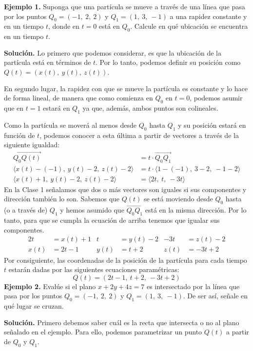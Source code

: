 \documentclass[12pt]{article}
\begin{document}
\textbf{Ejemplo 1.} Suponga que una partícula se mueve a través de una línea que pasa por los puntos $Q_{0} = (-1, \ 2, \ 2)$ y $Q_{1} = (1, \ 3, \ -1)$ a una rapidez constante y en un tiempo $t$, donde en $t = 0$ está en $Q_{0}$. Calcule en qué ubicación se encuentra en un tiempo $t$.

\textbf{Solución.} Lo primero que podemos considerar, es que la ubicación de la partícula está en términos de $t$. Por lo tanto, podemos definir su posición como $Q(t) = (x(t), \ y(t), \ z(t))$.

En segundo lugar, la rapidez con que se mueve la partícula es constante y lo hace de forma lineal, de manera que como comienza en $Q_{0}$ en $t = 0$, podemos asumir que en $t = 1$ estará en $Q_{1}$ ya que, además, ambos puntos son colineales.

Como la partícula se moverá al menos desde $Q_{0}$ hasta $Q_{1}$ y su posición estará en función de $t$, podemos conocer a esta última a partir de vectores a través de la siguiente igualdad:
\begin{align*}
  \overrightarrow{Q_{0}Q(t)} &= t \cdot \overrightarrow{Q_{0}Q_{1}} \\
  \langle x(t) - (-1), \ y(t) - 2, \ z(t) - 2 \rangle &= t \cdot \langle 1 - (-1), \ 3 - 2, \ - 1 - 2 \rangle \\
  \langle x(t) + 1, \ y(t) - 2, \ z(t) - 2 \rangle &= \langle 2t, \ t, \ -3t \rangle
\end{align*}
En la Clase 1 señalamos que dos o más vectores son iguales si sus componentes y dirección también lo son. Sabemos que $Q(t)$ se está moviendo desde $Q_{0}$ hasta (o a través de) $Q_{1}$ y hemos asumido que $\overrightarrow{Q_{0}Q_{1}}$ está en la misma dirección. Por lo tanto, para que se cumpla la ecuación de arriba tenemos que igualar sus componentes.
\begin{align*}
2t &= x(t) + 1 & t &= y(t) - 2 & -3t &= z(t) - 2 \\
x(t) &= 2t - 1 & y(t) &= t + 2 & z(t) &= -3t + 2
\end{align*}
Por consiguiente, las coordenadas de la posición de la partícula para cada tiempo $t$ estarán dadas por las siguientes ecuaciones paramétricas:
\[
  Q(t) = (2t - 1, \ t + 2, \ -3t + 2)
\]
\textbf{Ejemplo 2.} Evalúe si el plano $x + 2y + 4z = 7$ es intersectado por la línea que pasa por los puntos $Q_{0} = (-1, \ 2, \ 2)$ y $Q_{1} = (1, \ 3, \ -1)$. De ser así, señale en qué lugar se cruzan.

\textbf{Solución.} Primero debemos saber cuál es la recta que intersecta o no al plano señalado en el ejemplo. Para ello, podemos parametrizar un punto $Q(t)$ a partir de $Q_{0}$ y $Q_{1}$.
\end{document}
